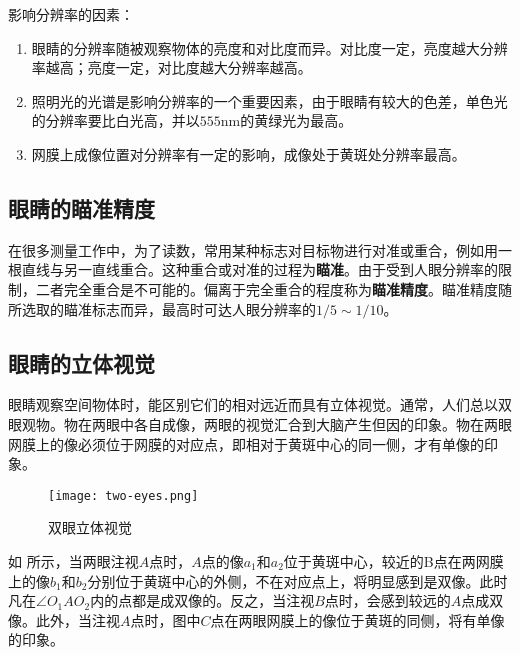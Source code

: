 \documentclass[cn,10pt,chinesefont=founder,math=newtx,cite=super,twoside]{elegantbook}
\begin{document}
\begin{note}
	影响分辨率的因素：
	\begin{enumerate}
		\item 眼睛的分辨率随被观察物体的亮度和对比度而异。对比度一定，亮度越大分辨率越高；亮度一定，对比度越大分辨率越高。
		\item 照明光的光谱是影响分辨率的一个重要因素，由于眼睛有较大的色差，单色光的分辨率要比白光高，并以$555$nm的黄绿光为最高。
		\item 网膜上成像位置对分辨率有一定的影响，成像处于黄斑处分辨率最高。
	\end{enumerate}
\end{note}

\subsection{眼睛的瞄准精度}
在很多测量工作中，为了读数，常用某种标志对目标物进行对准或重合，例如用一根直线与另一直线重合。这种重合或对准的过程为\textbf{瞄准}。由于受到人眼分辨率的限制，二者完全重合是不可能的。偏离于完全重合的程度称为\textbf{瞄准精度}。瞄准精度随所选取的瞄准标志而异，最高时可达人眼分辨率的$1/5\sim1/10$。

\subsection{眼睛的立体视觉}
眼睛观察空间物体时，能区别它们的相对远近而具有立体视觉。通常，人们总以双眼观物。物在两眼中各自成像，两眼的视觉汇合到大脑产生但因的印象。物在两眼网膜上的像必须位于网膜的对应点，即相对于黄斑中心的同一侧，才有单像的印象。

\begin{figure}[htbp]
	\centering
	\texttt{[image: two-eyes.png]}
	\caption{双眼立体视觉}
	\label{fig:two-eyes}
\end{figure}

如 所示，当两眼注视$A$点时，$A$点的像$a_1$和$a_2$位于黄斑中心，较近的B点在两网膜上的像$b_1$和$b_2$分别位于黄斑中心的外侧，不在对应点上，将明显感到是双像。此时凡在$\angle O_1AO_2$内的点都是成双像的。反之，当注视$B$点时，会感到较远的$A$点成双像。此外，当注视$A$点时，图中$C$点在两眼网膜上的像位于黄斑的同侧，将有单像的印象。
\end{document}
